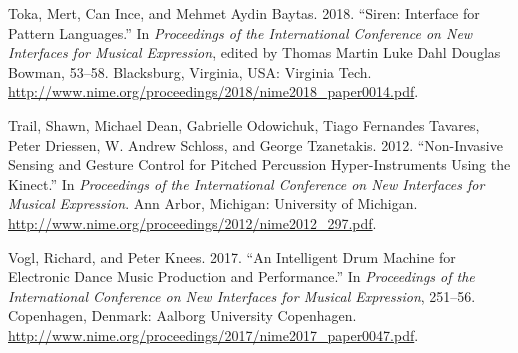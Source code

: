 \documentclass{nime-alternate} %
\newlength{\cslhangindent}
\newenvironment{cslreferences}%
  {\setlength{\parindent}{0pt}%
  \everypar{\setlength{\hangindent}{\cslhangindent}}\ignorespaces}%
  {\par}
\begin{document}
\begin{cslreferences}
\leavevmode\hypertarget{ref-Toka2018}{}%
Toka, Mert, Can Ince, and Mehmet Aydin Baytas. 2018. ``Siren: Interface
for Pattern Languages.'' In \emph{Proceedings of the International
Conference on New Interfaces for Musical Expression}, edited by Thomas
Martin Luke Dahl Douglas Bowman, 53--58. Blacksburg, Virginia, USA:
Virginia Tech.
\url{http://www.nime.org/proceedings/2018/nime2018_paper0014.pdf}.

\leavevmode\hypertarget{ref-Trail:2012a}{}%
Trail, Shawn, Michael Dean, Gabrielle Odowichuk, Tiago Fernandes
Tavares, Peter Driessen, W. Andrew Schloss, and George Tzanetakis. 2012.
``Non-Invasive Sensing and Gesture Control for Pitched Percussion
Hyper-Instruments Using the Kinect.'' In \emph{Proceedings of the
International Conference on New Interfaces for Musical Expression}. Ann
Arbor, Michigan: University of Michigan.
\url{http://www.nime.org/proceedings/2012/nime2012_297.pdf}.

\leavevmode\hypertarget{ref-rvogl2017}{}%
Vogl, Richard, and Peter Knees. 2017. ``An Intelligent Drum Machine for
Electronic Dance Music Production and Performance.'' In
\emph{Proceedings of the International Conference on New Interfaces for
Musical Expression}, 251--56. Copenhagen, Denmark: Aalborg University
Copenhagen.
\url{http://www.nime.org/proceedings/2017/nime2017_paper0047.pdf}.
\end{cslreferences}
\end{document}
